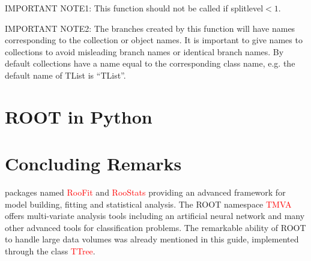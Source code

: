 \documentclass[12pt,a4paper]{article}
\begin{document}
IMPORTANT NOTE1: This function should not be called if splitlevel$<1$. 

IMPORTANT NOTE2: The branches created by this function will have names corresponding to the collection or object names. It is important to give names to collections to avoid misleading branch names or identical branch names. By default collections have a name equal to the corresponding class name, e.g. the default name of TList is ``TList”.






\section{ROOT in Python}




\section{Concluding Remarks}

packages named \textcolor{red}{RooFit} and \textcolor{red}{RooStats} providing an advanced framework for model building, fitting and statistical analysis. The ROOT namespace \textcolor{red}{TMVA} offers multi-variate analysis tools including an artificial neural network and many other advanced tools for classification problems. The remarkable ability of ROOT to handle large data volumes was already mentioned in this guide, implemented through the class \textcolor{red}{TTree}. 
\end{document}
